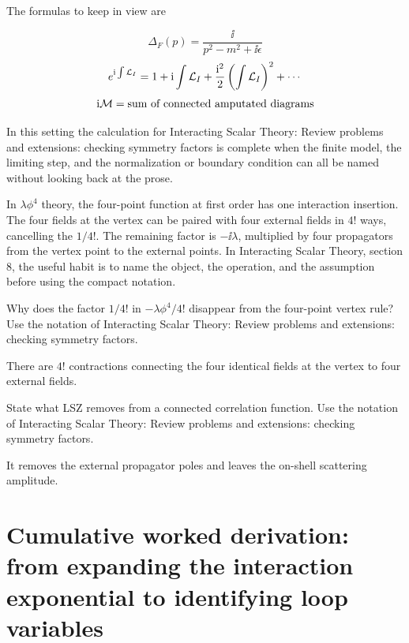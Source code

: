 The formulas to keep in view are

\[
  \Delta_F(p)=\frac{\ii}{p^2-m^2+\ii\epsilon}
\]
\[
  e^{\mathrm i\int\mathcal L_I}=1+\mathrm i\int\mathcal L_I+\frac{\mathrm i^2}{2}\left(\int\mathcal L_I\right)^2+\cdots
\]
\[
  \mathrm i\mathcal M=\hbox{sum of connected amputated diagrams}
\]

In this setting the calculation for Interacting Scalar Theory: Review problems and extensions: checking symmetry factors is complete when the finite model, the limiting step, and the normalization or boundary condition can all be named without looking back at the prose.




\begin{example}
In \(\lambda\phi^4\) theory, the four-point function at first order has one interaction insertion.  The four fields at the vertex can be paired with four external fields in \(4!\) ways, cancelling the \(1/4!\).  The remaining factor is \(-\ii\lambda\), multiplied by four propagators from the vertex point to the external points.  In Interacting Scalar Theory, section 8, the useful habit is to name the object, the operation, and the assumption before using the compact notation.
\end{example}



\begin{exercise}
Why does the factor \(1/4!\) in \(-\lambda\phi^4/4!\) disappear from the four-point vertex rule?  Use the notation of Interacting Scalar Theory: Review problems and extensions: checking symmetry factors.
\begin{answer}
There are \(4!\) contractions connecting the four identical fields at the vertex to four external fields.
\end{answer}
\end{exercise}

\begin{exercise}
State what LSZ removes from a connected correlation function.  Use the notation of Interacting Scalar Theory: Review problems and extensions: checking symmetry factors.
\begin{answer}
It removes the external propagator poles and leaves the on-shell scattering amplitude.
\end{answer}
\end{exercise}



\section{Cumulative worked derivation: from expanding the interaction exponential to identifying loop variables}

